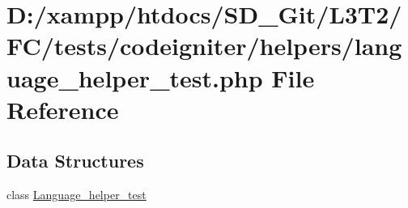 \hypertarget{tests_2codeigniter_2helpers_2language__helper__test_8php}{}\section{D\+:/xampp/htdocs/\+S\+D\+\_\+\+Git/\+L3\+T2/\+F\+C/tests/codeigniter/helpers/language\+\_\+helper\+\_\+test.php File Reference}
\label{tests_2codeigniter_2helpers_2language__helper__test_8php}
\subsection*{Data Structures}
\begin{DoxyCompactItemize}
\item 
class \hyperlink{class_language__helper__test}{Language\+\_\+helper\+\_\+test}
\end{DoxyCompactItemize}
